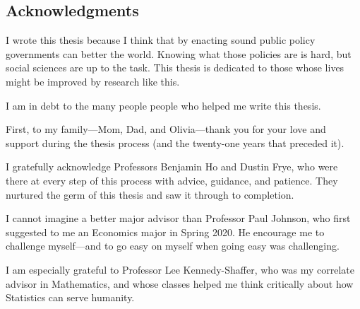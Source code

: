 \documentclass[11pt]{article}
\begin{document}
\singlespacing
\setcounter{page}{2}
\tableofcontents
\pagebreak
\listoffigures
\listoftables
\pagebreak

    

\doublespacing

\begin{center}\section*{Acknowledgments}\end{center}

I wrote this thesis because I think that by enacting sound public policy governments can better the world. Knowing what those policies are is hard, but social sciences are up to the task. This thesis is dedicated to those whose lives might be improved by research like this.

I am in debt to the many people people who helped me write this thesis.

First, to my family---Mom, Dad, and Olivia---thank you for your love and support during the thesis process (and the twenty-one years that preceded it).

I gratefully acknowledge Professors Benjamin Ho and Dustin Frye, who were there at every step of this process with advice, guidance, and patience. They nurtured the germ of this thesis and saw it through to completion.

I cannot imagine a better major advisor than Professor Paul Johnson, who first suggested to me an Economics major in Spring 2020. He encourage me to challenge myself---and to go easy on myself when going easy was challenging.

I am especially grateful to Professor Lee Kennedy-Shaffer, who was my correlate advisor in Mathematics, and whose classes helped me think critically about how Statistics can serve humanity.

\pagebreak

\doublespacing
\end{document}

